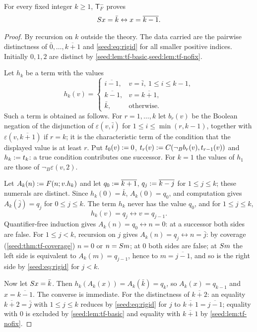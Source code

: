 \begin{proposition}
\label{seed:prop:tf-rigid}
For every fixed integer $k\geq1$, $\mathsf{T}_F^{-}$ proves
\begin{equation}\label{seed:eq:rigid}
 S x=\bar k\leftrightarrow x=\overline{k-1}.
\end{equation}
\end{proposition}

\begin{proof}
By recursion on $k$ outside the theory. The data carried are the pairwise
distinctness of $\bar0,\ldots,\overline{k+1}$ and \eqref{seed:eq:rigid} for
all smaller positive indices. Initially $0,1,2$ are distinct by
\cref{seed:lem:tf-basic,seed:lem:tf-nofix}.

Let $h_k$ be a term with the values
\[
 h_k(v)=\begin{cases}
 \overline{i-1},& v=\bar i,\ 1\leq i\leq k-1,\\
 \overline{k-1},& v=\overline{k+1},\\
 \bar k,&\text{otherwise.}
 \end{cases}
\]
Such a term is obtained as follows. For $r=1,\ldots,k$ let $b_r(v)$ be the
Boolean negation of the disjunction of $\varepsilon(v,\bar i)$ for
$1\leq i\leq\min(r,k-1)$, together with
$\varepsilon(v,\overline{k+1})$ if $r=k$; it is the characteristic term of
the condition that the displayed value is at least $r$. Put $t_0(v)\mathrel{:=}0$,
$t_r(v)\mathrel{:=} C(\neg_Bb_r(v),t_{r-1}(v))$ and $h_k\mathrel{:=} t_k$: a true
condition contributes one successor. For $k=1$ the values of $h_1$ are those
of $\neg_B\varepsilon(v,2)$.

Let $A_k(n)\mathrel{:=} F(n;v.h_k)$ and let $q_0\mathrel{:=}\overline{k+1}$,
$q_j\mathrel{:=}\overline{k-j}$ for $1\leq j\leq k$; these numerals are distinct.
Since $h_k(0)=\bar k$, $A_k(0)=q_0$, and computation gives
$A_k(\bar j)=q_j$ for $0\leq j\leq k$. The term $h_k$ never has the value
$q_0$, and for $1\leq j\leq k$,
\[
 h_k(v)=q_j\leftrightarrow v=q_{j-1}.
\]
Quantifier-free induction gives $A_k(n)=q_0\leftrightarrow n=0$: at a
successor both sides are false. For $1\leq j<k$, recursion on $j$ gives
$A_k(n)=q_j\leftrightarrow n=\bar j$: by coverage
(\cref{seed:thm:tf-coverage}) $n=0$ or $n=S m$; at $0$ both sides are
false; at $S m$ the left side is equivalent to $A_k(m)=q_{j-1}$, hence to
$m=\overline{j-1}$, and so is the right side by \eqref{seed:eq:rigid} for
$j<k$.

Now let $S x=\bar k$. Then $h_k(A_k(x))=A_k(\bar k)=q_k$, so
$A_k(x)=q_{k-1}$ and $x=\overline{k-1}$. The converse is immediate. For the
distinctness of $\overline{k+2}$: an equality $\overline{k+2}=\bar j$ with
$1\leq j\leq k$ reduces by \eqref{seed:eq:rigid} for $j$ to
$\overline{k+1}=\overline{j-1}$; equality with $0$ is excluded by
\cref{seed:lem:tf-basic} and equality with $\overline{k+1}$ by
\cref{seed:lem:tf-nofix}.
\end{proof}

